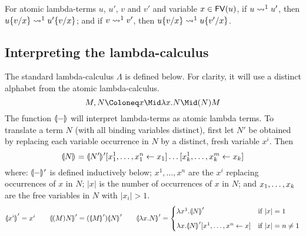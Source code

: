 \documentclass{llncs} %
\begin{document}
\begin{lemma}
For atomic lambda-terms $u$, $u'$, $v$ and $v'$ and variable $x \in {\mathop{\mathsf{FV}}}(u)$,
%
if $u \rewrite^1 u'$, then $u\sub xv \rewrite^1 u'\sub xv$; and
if $v\rewrite^1 v'$, then $u\sub xv \rewrite^1 u\sub x{v'}$.
\end{lemma}



\subsection{Interpreting the lambda-calculus}



The standard lambda-calculus $\Lambda$ is defined below.
%
For clarity, it will use a distinct alphabet from the atomic lambda-calculus.
%
\setMidspace{10pt}
\[
	M,N  \Coloneq  x \Mid  \lambda x.N  \Mid  (N)M  
\]
%
The function ${\llparenthesis{-}\rrparenthesis_{{}}}$ will interpret lambda-terms as atomic lambda terms.
%
To translate a term $N$ (with all binding variables distinct), first let $N'$ be obtained by replacing each variable occurrence in $N$ by a distinct, fresh variable $x^i$.
%
Then 
\[
	\tercoden N = \tercoden{N'}{}'\share*{x^1_1,\dots,x^n_1}{x_1}\dots\share*{x_k^1,\dots,x_k^m}{x_k}
\]
where: ${\llparenthesis{-}\rrparenthesis_{{}}}{}'$ is defined inductively below; $x^1,\dotsc,x^n$ are the $x^i$ replacing occurrences of $x$ in $N$; $|x|$ is the number of occurrences of $x$ in $N$; and $\vv[k]x$ are the free variables in $N$ with $|x_i|> 1$. 
\[
		\tercoden{x^i}' = x^i
\qquad	\tercoden{(M)N}' = (\tercoden M')\tercoden N'
\qquad	\tercoden{\lambda x.N}' =
			\begin{cases}
				\lambda x^1.\tercoden{N}' & \mbox{if $|x|=1$} \\ \\[-8pt]
				\lambda x.\tercoden{N}'\share*{x^1,\dots,x^n}x & \mbox{if $|x|=n\neq 1$}
			\end{cases}
\]
\end{document}
